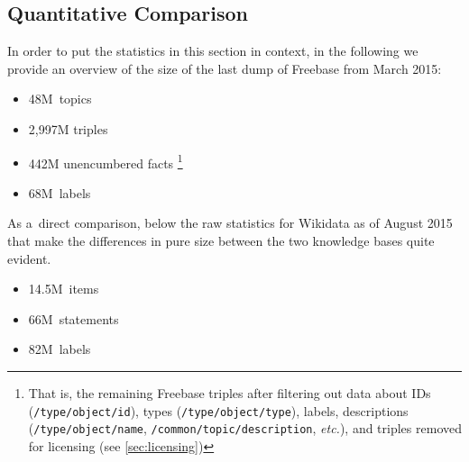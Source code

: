 \documentclass{acm_proc_article-sp}
\begin{document}
\subsection{Quantitative Comparison}

In order to put the statistics in this section in context,
in the following we provide an overview of the size of the last dump of Freebase
from March 2015:

\begin{itemize}
  \setlength\itemsep{0em}
  \item 48M~topics
  \item 2,997M triples
  \item 442M unencumbered facts%
    \footnote{That is, the remaining Freebase triples
      after filtering out data about IDs (\texttt{/type/object/id}),
      types (\texttt{/type/object/type}), labels, descriptions (\texttt{/type/object/name},
      \texttt{/common/topic/description}, \emph{etc.}), and triples removed
      for licensing (see \autoref{sec:licensing})}
  \item 68M~labels
\end{itemize}

As a~direct comparison, below the raw statistics for Wikidata as of August 2015
that make the differences in pure size between the two knowledge bases quite evident.

\begin{itemize}
    \setlength\itemsep{0em}
    \item 14.5M~items
    \item 66M~statements
    \item 82M~labels
\end{itemize}
\end{document}
